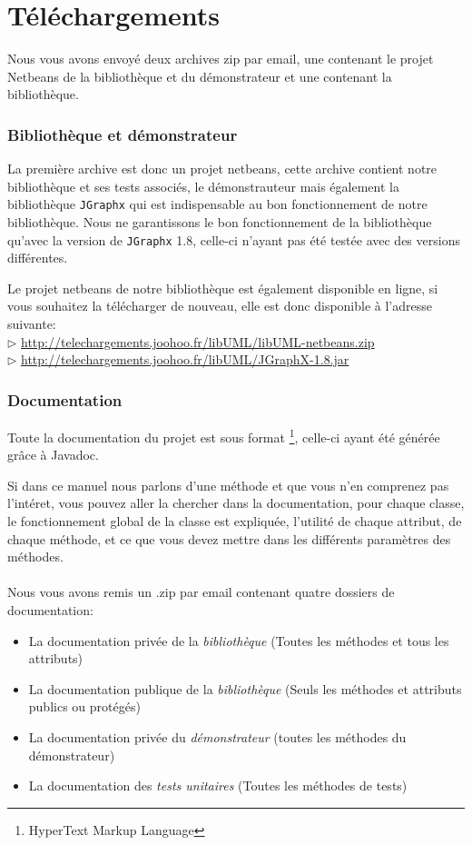 	\section*{Téléchargements}
	Nous vous avons envoyé deux archives zip par email, une contenant le projet Netbeans de la bibliothèque et du démonstrateur et une contenant la bibliothèque.
	\subsubsection*{Bibliothèque et démonstrateur}
	La première archive est donc un projet netbeans, cette archive contient notre bibliothèque et ses tests associés, le démonstrauteur mais
	également la bibliothèque \texttt{JGraphx} qui est indispensable au bon fonctionnement de notre bibliothèque. Nous ne garantissons le bon fonctionnement 
	de la bibliothèque qu'avec la version de \texttt{JGraphx} 1.8, celle-ci n'ayant pas été testée avec des versions différentes.

	Le projet netbeans de notre bibliothèque est également disponible en ligne, si vous souhaitez la télécharger de nouveau, elle est donc disponible à l'adresse suivante: \\
	$\rhd$ \url{http://telechargements.joohoo.fr/libUML/libUML-netbeans.zip}\\
	$\rhd$ \url{http://telechargements.joohoo.fr/libUML/JGraphX-1.8.jar}\\
	
	\subsubsection*{Documentation}
	Toute la documentation du projet est sous format \footnote{HyperText Markup Language}, celle-ci ayant été générée grâce à Javadoc.

	Si dans ce manuel nous parlons d'une méthode et que vous n'en comprenez pas l'intéret, vous pouvez aller la chercher dans la documentation, pour chaque classe,
	le fonctionnement global de la classe est expliquée, l'utilité de chaque attribut, de chaque méthode, et ce que vous devez mettre dans les différents paramètres 
	des méthodes.  
	\paragraph{}
	Nous vous avons remis un .zip par email contenant quatre dossiers de documentation:
	\begin{itemize}
		\item La documentation privée de la \textit{bibliothèque} (Toutes les méthodes et tous les attributs)
		\item La documentation publique de la \textit{bibliothèque} (Seuls les méthodes et attributs publics ou protégés)
		\item La documentation privée du \textit{démonstrateur} (toutes les méthodes du démonstrateur) 
		\item La documentation des \textit{tests unitaires} (Toutes les méthodes de tests)
	\end{itemize}
